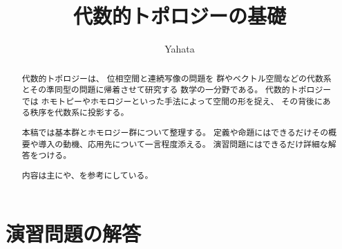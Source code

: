 \documentclass[report, notitlepage]{jlreq}
\title{代数的トポロジーの基礎}
\author{Yahata}
\date{}
\begin{document}
\maketitle
\begin{abstract}
    代数的トポロジーは、
    位相空間と連続写像の問題を
    群やベクトル空間などの代数系とその準同型の問題に帰着させて研究する
    数学の一分野である。
    代数的トポロジーでは
    ホモトピーやホモロジーといった手法によって空間の形を捉え、
    その背後にある秩序を代数系に投影する。

    本稿では基本群とホモロジー群について整理する。
    定義や命題にはできるだけその概要や導入の動機、応用先について一言程度添える。
    演習問題にはできるだけ詳細な解答をつける。

    内容は主に\cite{Rot98}や\cite{河澄22}、\cite{Lee10}を参考にしている。
\end{abstract}

\setcounter{tocdepth}{1}
\tableofcontents
\markboth{\contentsname}{}

%
\newpage


\newpage


\newpage


%
\newpage
{}
{}
\chapter*{演習問題の解答}


%
\newpage
{}
{}
\renewcommand{\bibname}{参考文献}
\markboth{\bibname}{}



%
\newpage
{}
{}
\printglossary[title={記号一覧}]

%
\newpage
{}
{}
\printindex
\end{document}

